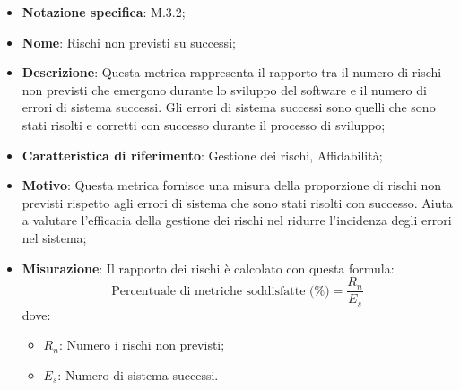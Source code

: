 \begin{itemize}
    \item \textbf{Notazione specifica}: M.3.2;
    \item \textbf{Nome}: Rischi non previsti su successi;
    \item \textbf{Descrizione}: Questa metrica rappresenta il rapporto tra il numero di rischi non previsti che emergono durante lo sviluppo del software e il numero di errori di sistema successi. Gli errori di sistema successi sono quelli che sono stati risolti e corretti con successo durante il processo di sviluppo;
    \item \textbf{Caratteristica di riferimento}: Gestione dei rischi, Affidabilità;
    \item \textbf{Motivo}: Questa metrica fornisce una misura della proporzione di rischi non previsti rispetto agli errori di sistema che sono stati risolti con successo. Aiuta a valutare l'efficacia della gestione dei rischi nel ridurre l'incidenza degli errori nel sistema;
    \item \textbf{Misurazione}: Il rapporto dei rischi è calcolato con questa formula:
    \[
        \text{Percentuale di metriche soddisfatte (\%)} =\frac{R_{n}}{E_{s}}
    \]
    dove:
    \begin{itemize}
        \item $R_{n}$: Numero i rischi non previsti;
        \item $E_{s}$: Numero di sistema successi.
    \end{itemize}
\end{itemize}
